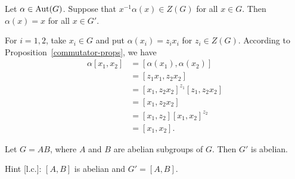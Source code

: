 \begin{exr}
    Let\/ $\alpha \in {\rm Aut}(G)$. Suppose that\/ $x^{-1}\alpha(x) \in Z(G)$ for all\/ $x\in G$. Then\/ $\alpha(x)=x$ for all\/ $x\in G'$.
\end{exr}

\begin{solution} For $i=1,2$, take $x_i\in G$ and put $\alpha(x_i)=z_ix_i$ for $z_i\in Z(G)$. According to Proposition~\ref{commutator-props}, we have
\begin{align*}
    \alpha[x_1,x_2] &= [\alpha(x_1),\alpha(x_2)]\\
        &= [z_1x_1,z_2x_2]\\
        &= [x_1,z_2x_2]^{z_1}[z_1,z_2x_2]\\
        &= [x_1,z_2x_2]\\
        &= [x_1,z_2][x_1,x_2]^{z_2}\\
        &= [x_1,x_2].
\end{align*}
 \end{solution}

\begin{exr} {\upshape [Ito]}
    Let\/ $G = AB$, where\/ $A$ and\/ $B$ are abelian subgroups of\/ $G$. Then\/ $G'$ is abelian.

    \textrm{\upshape Hint [l.c.]:} $[A,B]$ is abelian and $G'=[A,B]$.
\end{exr}

